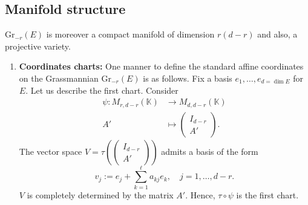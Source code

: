 \documentclass[10pt]{article}
\theoremstyle{plain}
\theoremstyle{definition}
\theoremstyle{remark}
\begin{document}
 \subsection{Manifold structure}\label{Manifold-struct}$\mathrm{Gr}_{-r}(E)$ is moreover a compact manifold of dimension $r(d-r)$ and also, a projective variety.
 \begin{enumerate}
     \item [1.]
 \textbf{Coordinates charts:} 
  One manner to define the standard affine coordinates on the Grassmannian $\mathrm{Gr}_{-r}(E)$ is as follows. Fix a basis $e_1,\ldots,e_{d=\dim E}$ for $E$. Let us describe the first chart. Consider
\begin{align*}
    \psi\colon M_{r,d-r}(\mathbb{K})&\longrightarrow M_{d,d-r}(\mathbb{K})\\A'\;&\longmapsto \begin{pmatrix}
 I_{d-r}\\ A'
 \end{pmatrix}.
\end{align*}
The vector space $V=\tau\left( \begin{pmatrix}I_{d-r}\\ A'\end{pmatrix}\right)$  admits a basis of the form\begin{equation}\label{eq: chart-grass}v_j:= e_j+\sum_{k=1}^\ell a_{kj}e_k,\quad j=1,\ldots,d-r.\end{equation}$V$ is completely determined by the matrix $A'$. Hence, $\tau\circ \psi$ is the first chart.


\end{enumerate}
\end{document}
